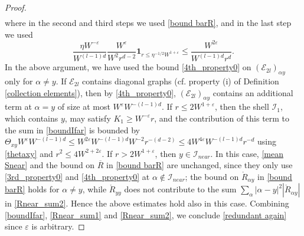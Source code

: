 \documentclass{article}
\newcommand{\1}{\mathds{1}}
\numberwithin{equation}{section}
\newcommand{\al}{\alpha}
\newcommand{\e}{{\varepsilon}}
\renewcommand{\cal}{\mathcal}
\renewcommand{\leq}{\leqslant}
\renewcommand{\geq}{\geqslant}
\renewcommand{\le}{\leq}
\renewcommand{\ge}{\geq}
\theoremstyle{plain} %
\theoremstyle{remark}
\newcommand{\Sele}{{\mathcal E}}
\newcommand{\Selek}{{\mathcal E}}
\begin{document}
\begin{proof}
\begin{align}
\end{align}
where in the second and third steps we used \eqref{bound barR}, and in the last step we used %
$$\frac{\eta W^{-\e}}{W^{(l-1)d}}\frac{W^\e}{W^2r^{d-2}}\mathbf 1_{r\le   \eta^{-1/2}W^{1+\e}}  \le  \frac{W^{2\e}}{W^{(l-1)d} r^{d}}.$$
In the above argument, we have used the bound \eqref{4th_property0} on $(\Selek_{2l})_{\al y}$ only for $\al\ne y$. If $\Sele_{2l}$ contains diagonal graphs (cf. property (i) of Definition \ref{collection elements}), then by \eqref{4th_property0}, $(\Selek_{2l})_{\al y}$ contains an additional term at $\al=y$ of size at most $W^{\e}W^{-(l-1)d}$. If $r\le 2W^{1+\e}$, then the shell $\cal I_1$, which contains $y$, may satisfy $K_1\ge W^{-\e}r$, and the contribution of this term to the sum in \eqref{boundIfar} is bounded by $\Theta_{xy}W^{\e}W^{-(l-1)d}\le W^{2\e}W^{-(l-1)d}W^{-2}r^{-(d-2)}\le 4W^{4\e}W^{-(l-1)d}r^{-d}$ using \eqref{thetaxy} and $r^2\le 4W^{2+2\e}$. If $r> 2W^{1+\e}$, then $y\in \cal I_{near}$. In this case, \eqref{mean Snear} and the bound on $\overline R$ in \eqref{bound barR} are unchanged, since they only use \eqref{3rd_property0} and \eqref{4th_property0} at $\al\notin \cal I_{near}$; the bound on $\mathring R_{\al y}$ in \eqref{bound barR} holds for $\al\ne y$, while $\mathring R_{yy}$ does not contribute to the sum $\sum_{\al}|\al-y|^2|\mathring R_{\al y}|$ in \eqref{Rnear_sum2}. Hence the above estimates hold also in this case. Combining \eqref{boundIfar}, \eqref{Rnear_sum1} and \eqref{Rnear_sum2}, we conclude \eqref{redundant again} since $\e$ is arbitrary.


\end{proof}
\end{document}
